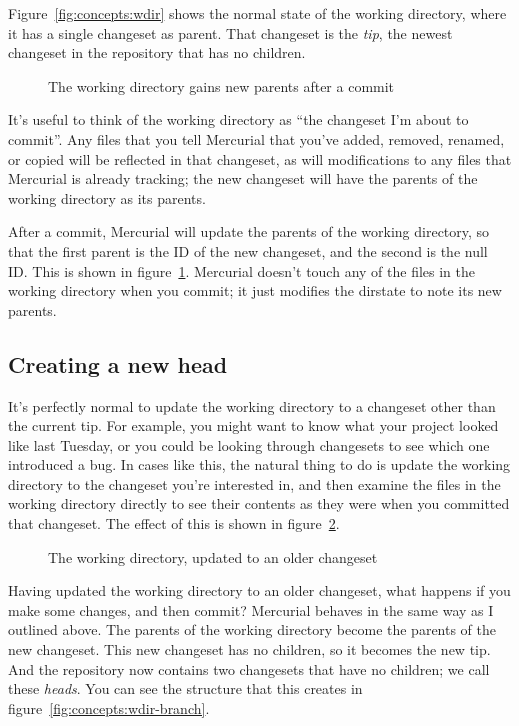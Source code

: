 Figure~\ref{fig:concepts:wdir} shows the normal state of the working
directory, where it has a single changeset as parent.  That changeset
is the \emph{tip}, the newest changeset in the repository that has no
children.

\begin{figure}[ht]
  \centering
  \caption{The working directory gains new parents after a commit}
  \label{fig:concepts:wdir-after-commit}
\end{figure}

It's useful to think of the working directory as ``the changeset I'm
about to commit''.  Any files that you tell Mercurial that you've
added, removed, renamed, or copied will be reflected in that
changeset, as will modifications to any files that Mercurial is
already tracking; the new changeset will have the parents of the
working directory as its parents.

After a commit, Mercurial will update the parents of the working
directory, so that the first parent is the ID of the new changeset,
and the second is the null ID.  This is shown in
figure~\ref{fig:concepts:wdir-after-commit}.  Mercurial doesn't touch
any of the files in the working directory when you commit; it just
modifies the dirstate to note its new parents.

\subsection{Creating a new head}

It's perfectly normal to update the working directory to a changeset
other than the current tip.  For example, you might want to know what
your project looked like last Tuesday, or you could be looking through
changesets to see which one introduced a bug.  In cases like this, the
natural thing to do is update the working directory to the changeset
you're interested in, and then examine the files in the working
directory directly to see their contents as they were when you
committed that changeset.  The effect of this is shown in
figure~\ref{fig:concepts:wdir-pre-branch}.

\begin{figure}[ht]
  \centering
  \caption{The working directory, updated to an older changeset}
  \label{fig:concepts:wdir-pre-branch}
\end{figure}

Having updated the working directory to an older changeset, what
happens if you make some changes, and then commit?  Mercurial behaves
in the same way as I outlined above.  The parents of the working
directory become the parents of the new changeset.  This new changeset
has no children, so it becomes the new tip.  And the repository now
contains two changesets that have no children; we call these
\emph{heads}.  You can see the structure that this creates in
figure~\ref{fig:concepts:wdir-branch}.

